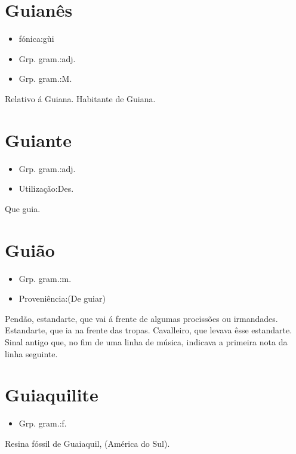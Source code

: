 \section{Guianês}
\begin{itemize}
\item {fónica:gùi}
\end{itemize}
\begin{itemize}
\item {Grp. gram.:adj.}
\end{itemize}
\begin{itemize}
\item {Grp. gram.:M.}
\end{itemize}
Relativo á Guiana.
Habitante de Guiana.
\section{Guiante}
\begin{itemize}
\item {Grp. gram.:adj.}
\end{itemize}
\begin{itemize}
\item {Utilização:Des.}
\end{itemize}
Que guia.
\section{Guião}
\begin{itemize}
\item {Grp. gram.:m.}
\end{itemize}
\begin{itemize}
\item {Proveniência:(De \textunderscore guiar\textunderscore )}
\end{itemize}
Pendão, estandarte, que vai á frente de algumas procissões ou irmandades.
Estandarte, que ia na frente das tropas.
Cavalleiro, que levava êsse estandarte.
Sinal antigo que, no fim de uma linha de música, indicava a primeira nota da linha seguinte.
\section{Guiaquilite}
\begin{itemize}
\item {Grp. gram.:f.}
\end{itemize}
Resina fóssil de Guaiaquil, (América do Sul).
